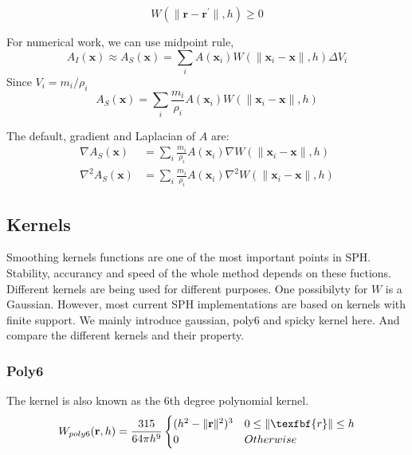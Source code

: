    \begin{equation}
        W(\|\textbf{r} - \textbf{r}^{\prime}\|, h) \ge 0
    \end{equation}

    For numerical work, we can use midpoint rule,
    \begin{equation}
        A_{I}(\textbf{x}) \approx A_{S}(\textbf{x}) = \sum_{i} A(\textbf{x}_{i})W(\|\textbf{x}_{i}-\textbf{x}\|, h)\Delta V_{i}
    \end{equation}
    Since $V_{i} = m_{i}/\rho _{i}$
    \begin{equation}
        A_{S}(\textbf{x}) = \sum_{i} \frac{m_{i}}{\rho_{i}} A(\textbf{x}_{i})W(\|\textbf{x}_{i}-\textbf{x}\|, h)
    \end{equation}

    The default, gradient and Laplacian of $A$ are:
    \begin{equation} \label{eq:1}
        \begin{aligned}
            \nabla A_{S}(\textbf{x}) &= \sum_{i} \frac{m_{i}}{\rho_{i}} A(\textbf{x}_{i})\nabla W(\|\textbf{x}_{i}-\textbf{x}\|, h) \\
            \nabla^{2} A_{S}(\textbf{x}) &= \sum_{i} \frac{m_{i}}{\rho_{i}} A(\textbf{x}_{i})\nabla^{2} W(\|\textbf{x}_{i}-\textbf{x}\|, h)
        \end{aligned}
        \label{eq:1}
    \end{equation}

    \subsection{Kernels}
    Smoothing kernels functions are one of the most important points in SPH. Stability, accurancy and speed of the whole method depends on these fuctions. Different kernels are being used for different purposes. One possibilyty for $W$ is a Gaussian. However, most current SPH implementations are based on kernels with finite support. We mainly introduce gaussian, poly6 and spicky kernel here. And compare the different kernels and their property.

    \subsubsection{Poly6}
    The kernel is also known as the 6th degree polynomial kernel.
    \begin{equation}
        W_{poly6}(\textbf{r}, h) = \frac{315}{64\pi h^{9}}
            \begin{cases}
                (h^2 - \|\textbf{r}\|^2)^3 & 0\le\|\texfbf{r}\|\le h \\
                0 & Otherwise
            \end{cases}
    \end{equation}

